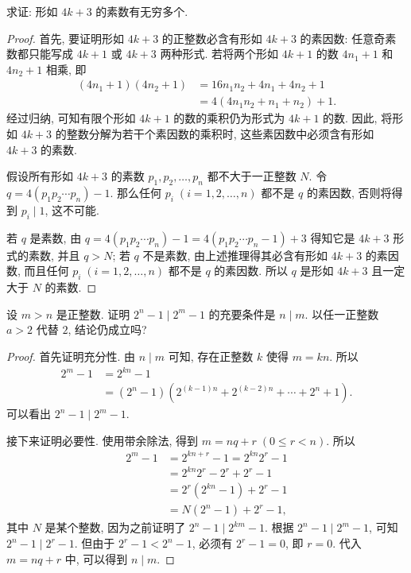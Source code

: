 \documentclass[a5paper,fleqn,10pt]{article}
\begin{document}
\begin{exmp}
    求证: 形如 $4k+3$ 的素数有无穷多个.
    \begin{proof}
        首先, 要证明形如 $4k+3$ 的正整数必含有形如 $4k+3$ 的素因数: 任意奇素数都只能写成 $4k+1$ 或 $4k+3$ 两种形式. 若将两个形如 $4k+1$ 的数 $4n_1+1$ 和 $4n_2+1$ 相乘, 即
        \begin{align*}
            (4n_1+1)(4n_2+1) & =16n_1n_2+4n_1+4n_2+1  \\
                             & =4(4n_1n_2+n_1+n_2)+1.
        \end{align*}
        经过归纳, 可知有限个形如 $4k+1$ 的数的乘积仍为形式为 $4k+1$ 的数. 因此, 将形如 $4k+3$ 的整数分解为若干个素因数的乘积时, 这些素因数中必须含有形如 $4k+3$ 的素数.

        假设所有形如 $4k+3$ 的素数 $p_1,p_2,\ldots,p_n$ 都不大于一正整数 $N$. 令 $q=4(p_1p_2\cdots p_n)-1$. 那么任何 $p_i\;(i=1,2,\ldots,n)$ 都不是
        $q$ 的素因数, 否则将得到 $p_i\mid1$, 这不可能.

        若 $q$ 是素数, 由 $q=4(p_1p_2\cdots p_n)-1=4(p_1p_2\cdots p_n-1)+3$ 得知它是 $4k+3$ 形式的素数, 并且 $q>N$; 若 $q$ 不是素数, 由上述推理得其必含有形如 $4k+3$
        的素因数, 而且任何 $p_i\;(i=1,2,\ldots,n)$ 都不是 $q$ 的素因数. 所以 $q$ 是形如 $4k+3$ 且一定大于 $N$ 的素数.
    \end{proof}
\end{exmp}

\begin{exmp}
    设 $m>n$ 是正整数. 证明 $2^n-1\mid 2^m-1$ 的充要条件是 $n\mid m$. 以任一正整数 $a>2$ 代替 $2$, 结论仍成立吗?
    \begin{proof}
        首先证明充分性. 由 $n\mid m$ 可知, 存在正整数 $k$ 使得 $m=kn$. 所以
        \begin{align*}
            2^m-1&=2^{kn}-1\\
            &=(2^n-1)(2^{(k-1)n}+2^{(k-2)n}+\cdots+2^n+1).
        \end{align*}
        可以看出 $2^n-1\mid 2^m-1$.

        接下来证明必要性. 使用带余除法, 得到 $m=nq+r\;(0\leq r<n)$. 所以
        \begin{align*}
            2^m-1&=2^{kn+r}-1=2^{kn}2^r-1\\
            &=2^{kn}2^r-2^r+2^r-1\\
            &=2^r(2^{kn}-1)+2^r-1\\
            &=N(2^n-1)+2^r-1,
        \end{align*}
        其中 $N$ 是某个整数, 因为之前证明了 $2^n-1\mid 2^{km}-1$. 根据 $2^n-1\mid 2^m-1$,
        可知 $2^n-1\mid 2^r-1$. 但由于 $2^r-1<2^n-1$, 必须有 $2^r-1=0$, 即 $r=0$. 代入 $m=nq+r$
        中, 可以得到 $n\mid m$.
    \end{proof}
\end{exmp}
\end{document}
